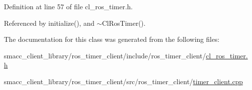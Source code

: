 Definition at line 57 of file cl\+\_\+ros\+\_\+timer.\+h.



Referenced by initialize(), and $\sim$\+Cl\+Ros\+Timer().



The documentation for this class was generated from the following files\+:\begin{DoxyCompactItemize}
\item 
smacc\+\_\+client\+\_\+library/ros\+\_\+timer\+\_\+client/include/ros\+\_\+timer\+\_\+client/\hyperlink{cl__ros__timer_8h}{cl\+\_\+ros\+\_\+timer.\+h}\item 
smacc\+\_\+client\+\_\+library/ros\+\_\+timer\+\_\+client/src/ros\+\_\+timer\+\_\+client/\hyperlink{timer__client_8cpp}{timer\+\_\+client.\+cpp}\end{DoxyCompactItemize}
